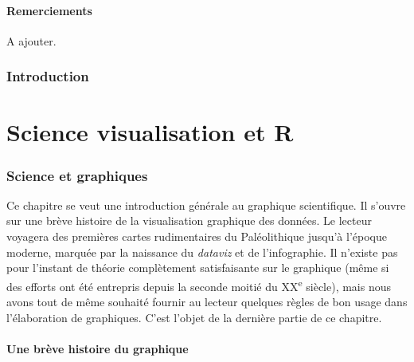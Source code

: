 \documentclass[]{article}
\begin{document}
\hypertarget{remerciements}{%
\subsection*{Remerciements}\label{remerciements}}

A ajouter.

\hypertarget{introduction}{%
\section{Introduction}\label{introduction}}

\hypertarget{part-science-visualisation-et-r}{%
\part{Science visualisation et R}\label{part-science-visualisation-et-r}}

\hypertarget{science-et-graphiques}{%
\section{Science et graphiques}\label{science-et-graphiques}}

Ce chapitre se veut une introduction générale au graphique scientifique. Il s'ouvre sur une brève histoire de la visualisation graphique des données. Le lecteur voyagera des premières cartes rudimentaires du Paléolithique jusqu'à l'époque moderne, marquée par la naissance du \emph{dataviz} et de l'infographie. Il n'existe pas pour l'instant de théorie complètement satisfaisante sur le graphique (même si des efforts ont été entrepris depuis la seconde moitié du XX\textsuperscript{e} siècle), mais nous avons tout de même souhaité fournir au lecteur quelques règles de bon usage dans l'élaboration de graphiques. C'est l'objet de la dernière partie de ce chapitre.

\hypertarget{une-breve-histoire-du-graphique}{%
\subsection{Une brève histoire du graphique}\label{une-breve-histoire-du-graphique}}
\end{document}

